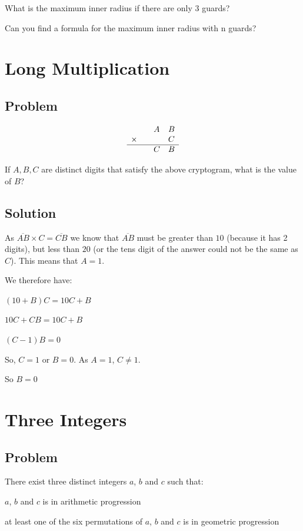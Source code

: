 \documentclass{book}
\begin{document}
What is the maximum inner radius if there are only 3 guards?

Can you find a formula for the maximum inner radius with n guards?
\newpage


\section{Long Multiplication}
\subsection{Problem}
\[ \begin{array} { l l l l }
& & A & B \\ \times & & & C \\ \hline & & C & B \\ \end{array} \]

If \( A, B, C \) are distinct digits that satisfy the above cryptogram, what is the value of \(B\)?
\subsection{Solution}
As \(\overline{AB}\times C = \overline{CB}\) we know that \(\overline{AB}\) must be greater than \(10\) (because it has 2 digits), but less than \(20\) (or the tens digit of the answer could not be the same as \(C\)). This means that \(A=1\).

We therefore have:

\((10+B)C=10C+B\)

\(10C+CB=10C+B\)

\((C-1)B=0\)

So, \(C=1\) or \(B=0\). As \(A=1\), \(C\neq 1\).

So \(\boxed{B=0}\)

\newpage

\section{Three Integers}
\subsection{Problem}
There exist three distinct integers \(a\), \(b\) and \(c\) such that:

\(a\), \(b\) and \(c\) is in arithmetic progression

at least one of the six permutations of \(a\), \(b\) and \(c\) is in geometric progression
\end{document}
